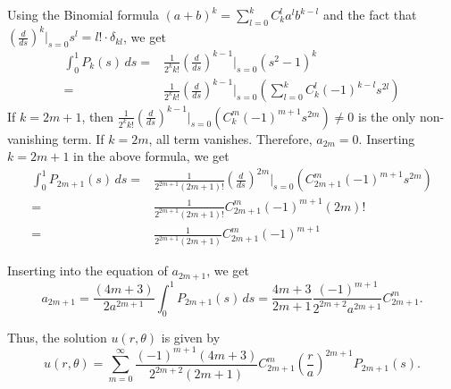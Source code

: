 Using the Binomial formula $(a + b)^k = \sum_{l = 0}^k C_k^l a^l b^{k - l}$ and the fact that $\left(\frac{d}{d s}\right)^k\Big|_{s = 0} s^l = l!\cdot \delta_{kl}$, we get 
\[
\begin{split}
    \int_0^1 P_{k}(s) \, ds
    =& \frac{1}{2^{k} k!} \left(\frac{d}{d s}\right)^{k-1}\bigg|_{s = 0}\left(s^2-1\right)^{k}
    \\
    =& \frac{1}{2^{k} k!} \left(\frac{d}{d s}\right)^{k-1}\bigg|_{s = 0}\left(\sum_{l = 0}^{k} C_{k}^l (-1)^{k-l}s^{2l}\right)
\end{split}
\]
If $k = 2m + 1$, then $\frac{1}{2^{k} k!} \left(\frac{d}{d s}\right)^{k-1}\bigg|_{s = 0}\left(C_{k}^{m} (-1)^{m+1}s^{2m}\right)\neq 0$ is the only non-vanishing term. If $k = 2m$, all term vanishes. Therefore, $a_{2m} = 0$. Inserting $k = 2m+1$ in the above formula, we get
\[
\begin{split}
    \int_0^1 P_{2m+1}(s) \, ds
    =& \frac{1}{2^{2m+1} (2m+1)!} \left(\frac{d}{d s}\right)^{2m}\bigg|_{s = 0}\left(C_{2m+1}^{m} (-1)^{m+1}s^{2m}\right) 
    \\
    =& \frac{1}{2^{2m+1} (2m+1)!} C_{2m+1}^{m} (-1)^{m+1} (2m)!
    \\
    =& \frac{1}{2^{2m+1} (2m+1)} C_{2m+1}^{m} (-1)^{m+1} 
\end{split}
\]


Inserting into the equation of $a_{2m+1}$, we get 
\[
a_{2m+1} = \frac{(4m + 3)}{2a^{2m+1}} \int_0^1 P_{2m+1}(s) \, ds = \frac{4m + 3}{2m+1} \frac{(-1)^{m+1}}{2^{2m+2}a^{2m+1}} C_{2m+1}^{m}.
\]

Thus, the solution $u(r, \theta)$ is given by
\[
    u(r, \theta) = \sum_{m=0}^\infty \frac{(-1)^{m+1}(4m + 3)}{2^{2m+2} (2m+1)} C_{2m+1}^{m} \left(\frac{r}{a}\right)^{2m+1} P_{2m+1}(s).
\]